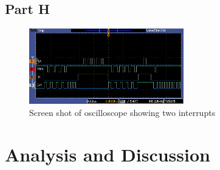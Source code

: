 \documentclass{article}
\begin{document}
	\subsection{Part H}
		\centering
		\begin{figure}[h]
			\centering
			\includegraphics[keepaspectratio, width=0.6\textwidth]{Lab2Screens/Lab2PartH}
			\caption{Screen shot of oscilloscope showing two interrupts}
		\end{figure}
		\raggedright

\section{Analysis and Discussion}
\end{document}
